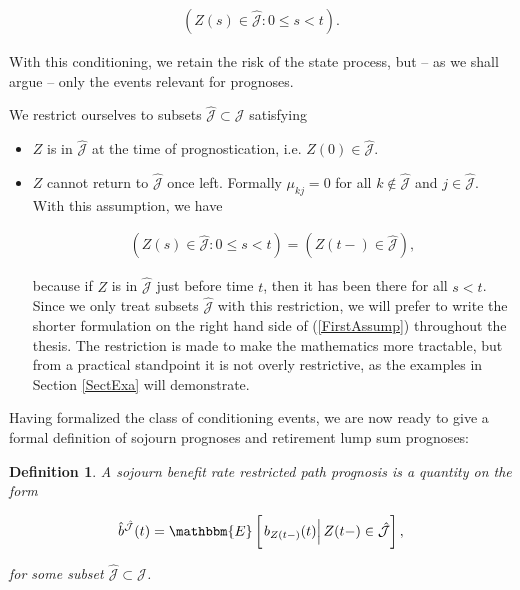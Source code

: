 \documentclass{article}
\newcommand{\1}[1]{\mathbbm{1}_{\left\lbrace #1 \right\rbrace}}
\newcommand{\econd}[2][def]{\mathbbm{E} \left[ \left. #1 \right| #2 \right]}
\theoremstyle{break}
\newtheorem{definition}{Definition}[section]
\theoremstyle{remark}
\numberwithin{equation}{section}
\begin{document}
\begin{align} \label{FirstCond}
	\left( Z(s) \in \hat{\mathcal{J}} : 0 \leq s < t \right).
\end{align}

With this conditioning, we retain the risk of the state process, but -- as we shall argue -- only the events relevant for prognoses.

We restrict ourselves to subsets $\hat{\mathcal{J}} \subset \mathcal{J}$ satisfying

\begin{itemize}
	\item $Z$ is in $\hat{\mathcal{J}}$ at the time of prognostication, i.e. $Z(0) \in \hat{\mathcal{J}}$.
	\item $Z$ cannot return to $\hat{\mathcal{J}}$ once left. Formally $\mu_{kj} = 0$ for all $k \notin \hat{\mathcal{J}}$ and $j \in \hat{\mathcal{J}}$. With this assumption, we have
	
	\begin{align} \label{FirstAssump}
		\left( Z(s) \in \hat{\mathcal{J}} : 0 \leq s < t \right) = \left( Z(t-) \in \hat{\mathcal{J}} \right),
	\end{align}
	
	because if $Z$ is in $\hat{\mathcal{J}}$ just before time $t$, then it has been there for all $s < t$. Since we only treat subsets $\hat{\mathcal{J}}$ with this restriction, we will prefer to write the shorter formulation on the right hand side of (\ref{FirstAssump}) throughout the thesis. The restriction is made to make the mathematics more tractable, but from a practical standpoint it is not overly restrictive, as the examples in Section \ref{SectExa} will demonstrate. 
\end{itemize}

Having formalized the class of conditioning events, we are now ready to give a formal definition of sojourn prognoses and retirement lump sum prognoses:

\begin{definition} \label{DefSojRestr}
	A sojourn benefit rate restricted path prognosis is a quantity on the form
	
	\begin{gather*}
		\hat{b}^{\hat{\mathcal{J}}}(t) = \econd[b_{Z(t-)}(t)]{Z(t-) \in \hat{\mathcal{J}}},
	\end{gather*}
	
	for some subset $\hat{\mathcal{J}} \subset \mathcal{J}$.
\end{definition}
\end{document}

